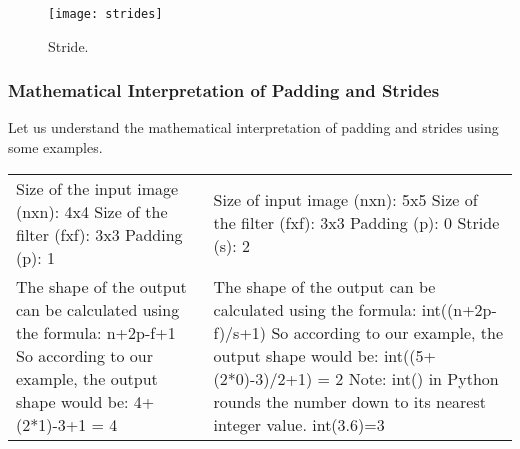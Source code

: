 	\begin{figure}[h]
		\centering
		\texttt{[image: strides]}
		\caption{Stride.}
		\label{fig:strides}
	\end{figure}


	\subsubsection{Mathematical Interpretation of Padding and Strides}

Let us understand the mathematical interpretation of padding and strides using some examples.


	\begin{topcaptiontable}
        \centering
        \label{tab:}
		\begin{tabular}{|p{}|p{}|} \hline
			\tablecolumnheadervlinesone{Example 1 - Only Padding} & \tablecolumnheadervlinestwo{Example 2 - Using Padding and Strides} \\ \hline
			Size of the input image (nxn): 4x4
Size of the filter (fxf): 3x3
Padding (p): 1 &
	        Size of input image (nxn): 5x5
Size of the filter (fxf): 3x3
Padding (p): 0
Stride (s): 2 \\ \hline
			 The shape of the output can be calculated using the formula: n+2p-f+1
So according to our example, the output shape would be: 4+(2*1)-3+1 = 4 &
	        The shape of the output can be calculated
using the formula: int((n+2p-f)/s+1)
So according to our example, the output
shape would be:
int((5+(2*0)-3)/2+1) = 2
Note: int() in Python rounds the number
down to its nearest integer value. int(3.6)=3 \\ \hline
		\end{tabular}
	\end{topcaptiontable}